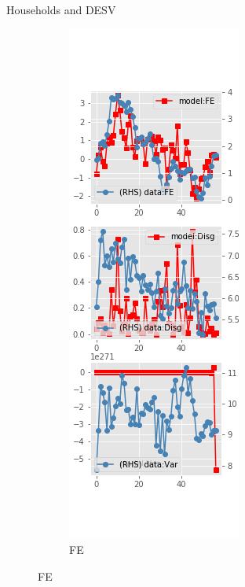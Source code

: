 \documentclass{beamer}
\begin{document}


\begin{frame}{Households and DESV}
	\begin{figure}[ht]
		\label{DESV_diag_SCE}
		\begin{subfigure}[b]{0.2\textwidth}
			\centering
			\caption{FE}
			\includegraphics[width=\textwidth, height = 0.8\textheight]{figuresDraft/sce_de_est_sv_diag0.png}

\end{subfigure}
\end{figure}
\end{frame}
\end{document}
